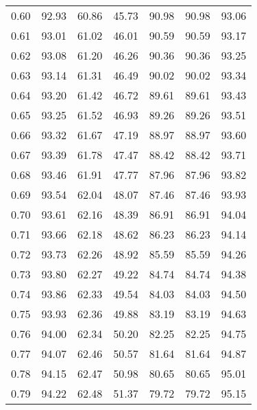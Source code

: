 \begin{tabular}{|c|c|c|c|c|c|c|}
      0.60 &     92.93 &     60.86 &      45.73 &   90.98 &      90.98 &         93.06 \\
      0.61 &     93.01 &     61.02 &      46.01 &   90.59 &      90.59 &         93.17 \\
      0.62 &     93.08 &     61.20 &      46.26 &   90.36 &      90.36 &         93.25 \\
      0.63 &     93.14 &     61.31 &      46.49 &   90.02 &      90.02 &         93.34 \\
      0.64 &     93.20 &     61.42 &      46.72 &   89.61 &      89.61 &         93.43 \\
      0.65 &     93.25 &     61.52 &      46.93 &   89.26 &      89.26 &         93.51 \\
      0.66 &     93.32 &     61.67 &      47.19 &   88.97 &      88.97 &         93.60 \\
      0.67 &     93.39 &     61.78 &      47.47 &   88.42 &      88.42 &         93.71 \\
      0.68 &     93.46 &     61.91 &      47.77 &   87.96 &      87.96 &         93.82 \\
      0.69 &     93.54 &     62.04 &      48.07 &   87.46 &      87.46 &         93.93 \\
      0.70 &     93.61 &     62.16 &      48.39 &   86.91 &      86.91 &         94.04 \\
      0.71 &     93.66 &     62.18 &      48.62 &   86.23 &      86.23 &         94.14 \\
      0.72 &     93.73 &     62.26 &      48.92 &   85.59 &      85.59 &         94.26 \\
      0.73 &     93.80 &     62.27 &      49.22 &   84.74 &      84.74 &         94.38 \\
      0.74 &     93.86 &     62.33 &      49.54 &   84.03 &      84.03 &         94.50 \\
      0.75 &     93.93 &     62.36 &      49.88 &   83.19 &      83.19 &         94.63 \\
      0.76 &     94.00 &     62.34 &      50.20 &   82.25 &      82.25 &         94.75 \\
      0.77 &     94.07 &     62.46 &      50.57 &   81.64 &      81.64 &         94.87 \\
      0.78 &     94.15 &     62.47 &      50.98 &   80.65 &      80.65 &         95.01 \\
      0.79 &     94.22 &     62.48 &      51.37 &   79.72 &      79.72 &         95.15 \\

\end{tabular}
